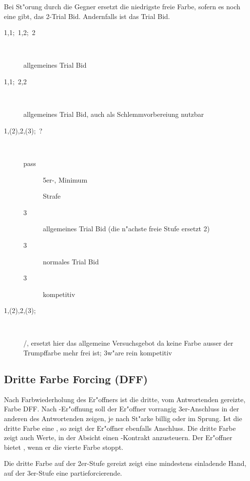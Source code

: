 Bei St"orung durch die Gegner ersetzt die niedrigste freie Farbe, sofern es
noch eine gibt, das 2\SA-Trial Bid. Andernfalls ist \kontra das Trial Bid.

\begin{description}
\item[1\tre{}\sep1\coe;~1\pik{}\sep2\pik;~2\SA]~

  allgemeines Trial Bid
\item[1\tre{}\sep1\pik;~2\pik{}\sep2\SA]~

  allgemeines Trial Bid, auch als Schlemmvorbereiung nutzbar
\item[1\pik{}\sep(2\tre)\sep2\pik{}\sep(3\tre);~?]~
  \begin{description}
    \item[pass] 5er-\pi, Minimum
    \item[\kontra] Strafe
    \item[3\kar] allgemeines Trial Bid (die n"achste freie Stufe
      ersetzt 2\SA)
    \item[3\coe] normales Trial Bid
    \item[3\pik] kompetitiv
  \end{description}
\item[1\pik{}\sep(2\coe)\sep2\pik{}\sep(3\coe);~\kontra]~

  /, ersetzt hier das
allgemeine Versuchsgebot da keine Farbe ausser der Trumpffarbe mehr frei ist;
3\pik w"are rein kompetitiv
\end{description}

\subsection{Dritte Farbe Forcing (DFF)} \label{dff}

Nach Farbwiederholung des Er"offners ist die dritte, vom Antwortenden gereizte,
Farbe DFF. Nach \ofa-Er"offnung soll der Er"offner vorrangig 3er-Anschluss in
der anderen \ofa des Antwortenden zeigen, je nach St"arke billig oder im
Sprung. Ist die dritte Farbe eine \ofa, so zeigt der Er"offner ebenfalls
Anschluss. Die dritte Farbe zeigt auch Werte, in der Absicht einen \sa-Kontrakt
anzusteuern. Der Er"offner bietet \sa, wenn er die vierte Farbe stoppt.

Die dritte Farbe auf der 2er-Stufe gereizt zeigt eine mindestens einladende
Hand, auf der 3er-Stufe eine partieforcierende.


